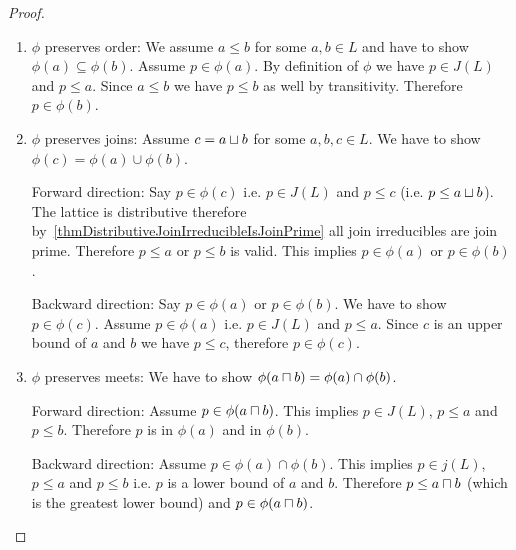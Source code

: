 \begin{theorem}
\begin{proof}
\begin{enumerate}
                Now remember that by definition of a downset we have
                $$
                    \downclosed F = \set{p \in J(L): \exists p_i \in F: p \le p_i}
                $$
                i.e. both sets are equivalent.


            \item $\phi$ preserves order: We assume $a \le b$ for some $a, b \in
                L$ and have to show $\phi(a) \subseteq \phi(b)$. Assume $p \in
                \phi(a)$. By definition of $\phi$ we have $p \in J(L)$ and $p
                \le a$. Since $a \le b$ we have $p \le b$ as well by
                transitivity. Therefore $p \in \phi(b)$.

            \item $\phi$ preserves joins: Assume $c = a \sqcup b$ for some $a, b,
                c \in L$. We have to show $\phi(c) = \phi(a) \cup \phi(b)$.

                Forward direction: Say $p \in \phi(c)$ i.e. $p \in J(L)$ and $p
                \le c$ (i.e. $p \le a \sqcup b$). The lattice is distributive
                therefore
                by~\ref{thmDistributiveJoinIrreducibleIsJoinPrime} all join
                irreducibles are join prime. Therefore $p \le a$ or $p \le b$
                is valid. This implies $p \in \phi(a)$ or $p \in \phi(b)$.

                Backward direction: Say $p \in \phi(a)$ or $p \in \phi(b)$. We
                have to show $p \in \phi(c)$. Assume $p \in \phi(a)$ i.e. $p \in
                J(L)$ and $p \le a$. Since $c$ is an upper bound of $a$ and $b$
                we have $p \le c$, therefore $p \in \phi(c)$.

            \item $\phi$ preserves meets: We have to show $\phi(a \sqcap b) =
                \phi(a) \cap \phi(b)$.

                Forward direction: Assume $p \in \phi(a \sqcap b)$. This implies
                $p \in J(L)$, $p \le a$ and $p \le b$. Therefore $p$ is in
                $\phi(a)$ and in $\phi(b)$.

                Backward direction: Assume $p \in \phi(a) \cap \phi(b)$. This
                implies $p \in j(L)$, $p \le a$ and $p \le b$ i.e. $p$ is a
                lower bound of $a$ and $b$. Therefore $p \le a \sqcap b$ (which
                is the greatest lower bound) and $p \in \phi(a \sqcap b)$.
        \end{enumerate}
    \end{proof}
\end{theorem}


